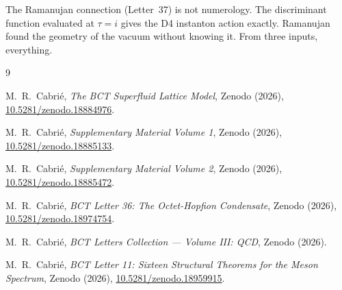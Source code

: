 \documentclass[aps,prl,twocolumn,showpacs,preprintnumbers]{revtex4-2}
\begin{document}
\noindent The Ramanujan connection (Letter~37) is not numerology.
The discriminant function evaluated at $\tau = i$ gives the D4
instanton action exactly. Ramanujan found the geometry of the vacuum
without knowing it. From three inputs, everything.

\begin{thebibliography}{9}

M.~R.\ Cabri\'e,
\textit{The BCT Superfluid Lattice Model},
Zenodo (2026),
\href{https://doi.org/10.5281/zenodo.18884976}{10.5281/zenodo.18884976}.

M.~R.\ Cabri\'e,
\textit{Supplementary Material Volume 1},
Zenodo (2026),
\href{https://doi.org/10.5281/zenodo.18885133}{10.5281/zenodo.18885133}.

M.~R.\ Cabri\'e,
\textit{Supplementary Material Volume 2},
Zenodo (2026),
\href{https://doi.org/10.5281/zenodo.18885472}{10.5281/zenodo.18885472}.

M.~R.\ Cabri\'e,
\textit{BCT Letter 36: The Octet-Hopfion Condensate},
Zenodo (2026),
\href{https://doi.org/10.5281/zenodo.18974754}{10.5281/zenodo.18974754}.

M.~R.\ Cabri\'e,
\textit{BCT Letters Collection --- Volume III: QCD},
Zenodo (2026).

M.~R.\ Cabri\'e,
\textit{BCT Letter 11: Sixteen Structural Theorems for the Meson Spectrum},
Zenodo (2026),
\href{https://doi.org/10.5281/zenodo.18959915}{10.5281/zenodo.18959915}.

\end{thebibliography}
\end{document}
